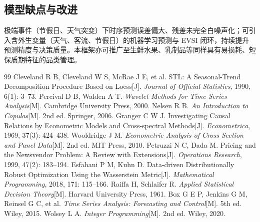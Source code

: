 \documentclass[UTF8,fontset=none,a4paper,11pt]{ctexart}
\begin{document}
\subsection{模型缺点与改进}
极端事件（节假日、天气突变）下时序预测误差偏大、残差未完全白噪声化；可引入含外生变量（天气、客流、节假日）的机器学习预测与 EVSI 闭环，持续提升预测精度与决策质量。本框架亦可推广至生鲜水果、乳制品等同样具有易损耗、短保质期特征的品类管理。

\begin{thebibliography}{99}
\setlength{\itemsep}{1pt}
 Cleveland R B, Cleveland W S, McRae J E, et al. STL: A Seasonal-Trend Decomposition Procedure Based on Loess[J]. \textit{Journal of Official Statistics}, 1990, 6(1): 3--73.
 Percival D B, Walden A T. \textit{Wavelet Methods for Time Series Analysis}[M]. Cambridge University Press, 2000.
 Nelsen R B. \textit{An Introduction to Copulas}[M]. 2nd ed. Springer, 2006.
 Granger C W J. Investigating Causal Relations by Econometric Models and Cross-spectral Methods[J]. \textit{Econometrica}, 1969, 37(3): 424--438.
 Wooldridge J M. \textit{Econometric Analysis of Cross Section and Panel Data}[M]. 2nd ed. MIT Press, 2010.
 Petruzzi N C, Dada M. Pricing and the Newsvendor Problem: A Review with Extensions[J]. \textit{Operations Research}, 1999, 47(2): 183--194.
 Esfahani P M, Kuhn D. Data-driven Distributionally Robust Optimization Using the Wasserstein Metric[J]. \textit{Mathematical Programming}, 2018, 171: 115--166.
 Raiffa H, Schlaifer R. \textit{Applied Statistical Decision Theory}[M]. Harvard University Press, 1961.
 Box G E P, Jenkins G M, Reinsel G C, et al. \textit{Time Series Analysis: Forecasting and Control}[M]. 5th ed. Wiley, 2015.
 Wolsey L A. \textit{Integer Programming}[M]. 2nd ed. Wiley, 2020.
\end{thebibliography}
\end{document}
